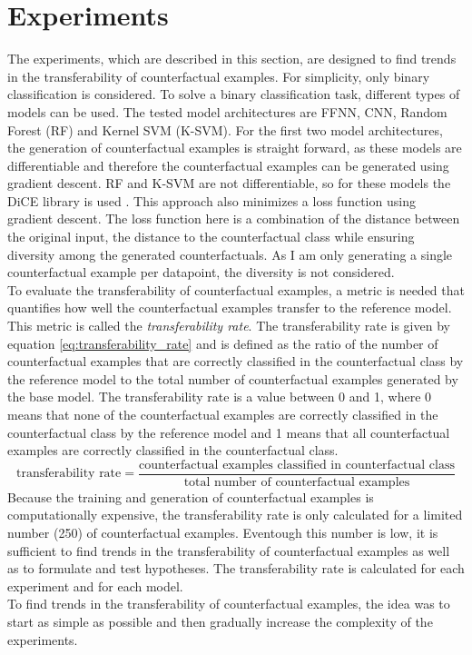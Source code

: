 \documentclass{article}
\begin{document}
\section{Experiments}
The experiments, which are described in this section, are designed to find trends in the transferability of counterfactual examples. For simplicity, only binary classification is considered. To solve a binary classification task, different types of models can be used. The tested model architectures are FFNN, CNN, Random Forest (RF) and Kernel SVM (K-SVM). For the first two model architectures, the generation of counterfactual examples is straight forward, as these models are differentiable and therefore the counterfactual examples can be generated using gradient descent. RF and K-SVM are not differentiable, so for these models the DiCE library is used \cite{dice_cf}. This approach also minimizes a loss function using gradient descent. The loss function here is a combination of the distance between the original input, the distance to the counterfactual class while ensuring diversity among the generated counterfactuals. As I am only generating a single counterfactual example per datapoint, the diversity is not considered. \\
To evaluate the transferability of counterfactual examples, a metric is needed that quantifies how well the counterfactual examples transfer to the reference model. This metric is called the \textit{transferability rate}. The transferability rate is given by equation \ref{eq:transferability_rate} and is defined as the ratio of the number of counterfactual examples that are correctly classified in the counterfactual class by the reference model to the total number of counterfactual examples generated by the base model. The transferability rate is a value between 0 and 1, where 0 means that none of the counterfactual examples are correctly classified in the counterfactual class by the reference model and 1 means that all counterfactual examples are correctly classified in the counterfactual class.\\
\begin{equation}
    \text{transferability rate} = \frac{\text{counterfactual examples classified in counterfactual class}}{\text{total number of counterfactual examples}}
    \label{eq:transferability_rate}
\end{equation}
Because the training and generation of counterfactual examples is computationally expensive, the transferability rate is only calculated for a limited number (250) of counterfactual examples. Eventough this number is low, it is sufficient to find trends in the transferability of counterfactual examples as well as to formulate and test hypotheses. The transferability rate is calculated for each experiment and for each model.\\
To find trends in the transferability of counterfactual examples, the idea was to start as simple as possible and then gradually increase the complexity of the experiments. 
\end{document}
